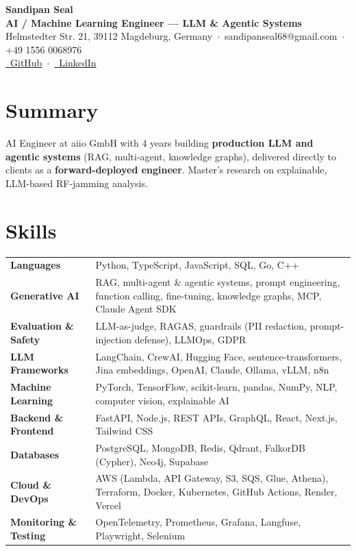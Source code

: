 \documentclass[10pt,a4paper]{article}
\begin{document}
\begin{center}
{\LARGE\bfseries Sandipan Seal}\\[2pt]
{\bfseries AI / Machine Learning Engineer --- LLM \& Agentic Systems}\\[3pt]
\small Helmstedter Str. 21, 39112 Magdeburg, Germany \,$\cdot$\, sandipanseal68@gmail.com \,$\cdot$\, +49 1556 0068976\\
\href{https://github.com/sandipanseal}{\faGithub\ GitHub} \,$\cdot$\, \href{https://www.linkedin.com/in/sandipan-seal-68198b216/}{\faLinkedin\ LinkedIn}
\end{center}
\vspace{-4pt}

\section*{Summary}
AI Engineer at aiio GmbH with 4 years building \textbf{production LLM and agentic systems} (RAG, multi-agent, knowledge graphs), delivered directly to clients as a \textbf{forward-deployed engineer}. Master's research on explainable, LLM-based RF-jamming analysis.

\section*{Skills}
\small
\renewcommand{\arraystretch}{1.18}
\begin{tabularx}{\linewidth}{@{}>{\bfseries}p{3.7cm}X@{}}
Languages & Python, TypeScript, JavaScript, SQL, Go, C++ \\
Generative AI & RAG, multi-agent \& agentic systems, prompt engineering, function calling, fine-tuning, knowledge graphs, MCP, Claude Agent SDK \\
Evaluation \& Safety & LLM-as-judge, RAGAS, guardrails (PII redaction, prompt-injection defense), LLMOps, GDPR \\
LLM Frameworks & LangChain, CrewAI, Hugging Face, sentence-transformers, Jina embeddings, OpenAI, Claude, Ollama, vLLM, n8n \\
Machine Learning & PyTorch, TensorFlow, scikit-learn, pandas, NumPy, NLP, computer vision, explainable AI \\
Backend \& Frontend & FastAPI, Node.js, REST APIs, GraphQL, React, Next.js, Tailwind CSS \\
Databases & PostgreSQL, MongoDB, Redis, Qdrant, FalkorDB (Cypher), Neo4j, Supabase \\
Cloud \& DevOps & AWS (Lambda, API Gateway, S3, SQS, Glue, Athena), Terraform, Docker, Kubernetes, GitHub Actions, Render, Vercel \\
Monitoring \& Testing & OpenTelemetry, Prometheus, Grafana, Langfuse, Playwright, Selenium \\
\end{tabularx}
\normalsize
\end{document}
